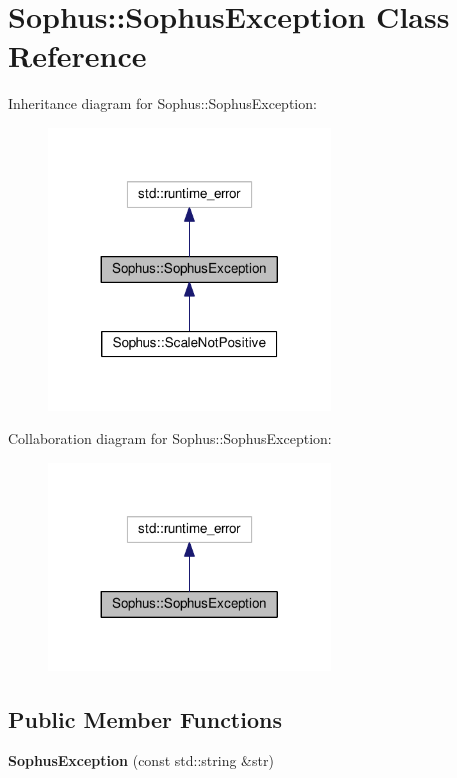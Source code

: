 \hypertarget{class_sophus_1_1_sophus_exception}{}\section{Sophus\+:\+:Sophus\+Exception Class Reference}
\label{class_sophus_1_1_sophus_exception}


Inheritance diagram for Sophus\+:\+:Sophus\+Exception\+:
\nopagebreak
\begin{figure}[H]
\begin{center}
\leavevmode
\includegraphics[width=212pt]{class_sophus_1_1_sophus_exception__inherit__graph}
\end{center}
\end{figure}


Collaboration diagram for Sophus\+:\+:Sophus\+Exception\+:
\nopagebreak
\begin{figure}[H]
\begin{center}
\leavevmode
\includegraphics[width=212pt]{class_sophus_1_1_sophus_exception__coll__graph}
\end{center}
\end{figure}
\subsection*{Public Member Functions}
\begin{DoxyCompactItemize}
\item 
{\bfseries Sophus\+Exception} (const std\+::string \&str)\hypertarget{class_sophus_1_1_sophus_exception_a0be113e757a34e37428e52110f565abd}{}\label{class_sophus_1_1_sophus_exception_a0be113e757a34e37428e52110f565abd}

\end{DoxyCompactItemize}


